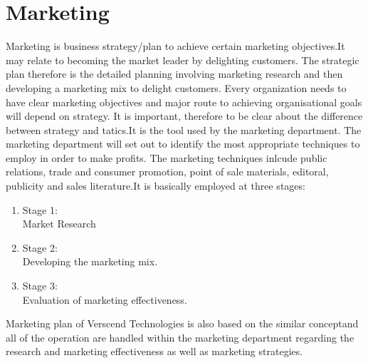 \section{Marketing}
Marketing is business strategy/plan to achieve certain marketing objectives.It may relate to becoming the market leader by delighting customers. The strategic plan therefore is the detailed planning involving marketing research and then developing a marketing mix to delight customers. Every organization needs to have clear marketing objectives and major route to achieving organisational goals will depend on strategy. It is important, therefore to be clear about the difference between strategy and tatics.It is the tool used by the marketing department. The marketing department will set out to identify the most appropriate techniques to employ in order to make profits. The marketing techniques inlcude public relations, trade and consumer promotion, point of sale materials, editoral, publicity and sales literature.It is basically employed at three stages:
\begin{enumerate}
\item Stage 1:\\
Market Research
\item Stage 2:\\
Developing the marketing mix.
\item Stage 3: \\
Evaluation of marketing effectiveness.
\end{enumerate}
Marketing plan of Verscend Technologies is also based on the similar conceptand all of the operation are handled within the marketing department regarding the research and marketing effectiveness as well as marketing strategies.
\cleardoublepage

